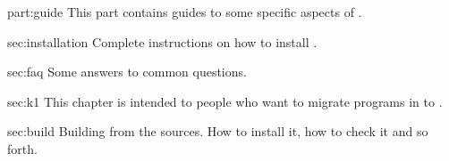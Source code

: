 \begin{partDescription}{part:guide}
  {
    This part contains guides to some specific aspects of \usdk.
  }
\item[sec:installation]
  Complete instructions on how to install \usdk.
\item[sec:faq]
  Some answers to common questions.
\item[sec:k1] This chapter is intended to people who want to migrate
  programs in  to .
\item[sec:build] Building \usdk from the sources.  How to install it,
  how to check it and so forth.
\end{partDescription}

